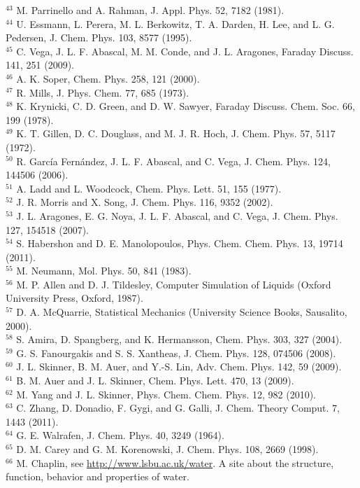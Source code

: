 \documentclass[10pt]{article}
\begin{document}
${ }^{43}$ M. Parrinello and A. Rahman, J. Appl. Phys. 52, 7182 (1981).\\
${ }^{44}$ U. Essmann, L. Perera, M. L. Berkowitz, T. A. Darden, H. Lee, and L. G. Pedersen, J. Chem. Phys. 103, 8577 (1995).\\
${ }^{45}$ C. Vega, J. L. F. Abascal, M. M. Conde, and J. L. Aragones, Faraday Discuss. 141, 251 (2009).\\
${ }^{46}$ A. K. Soper, Chem. Phys. 258, 121 (2000).\\
${ }^{47}$ R. Mills, J. Phys. Chem. 77, 685 (1973).\\
${ }^{48}$ K. Krynicki, C. D. Green, and D. W. Sawyer, Faraday Discuss. Chem. Soc. 66, 199 (1978).\\
${ }^{49}$ K. T. Gillen, D. C. Douglass, and M. J. R. Hoch, J. Chem. Phys. 57, 5117 (1972).\\
${ }^{50}$ R. García Fernández, J. L. F. Abascal, and C. Vega, J. Chem. Phys. 124, 144506 (2006).\\
${ }^{51}$ A. Ladd and L. Woodcock, Chem. Phys. Lett. 51, 155 (1977).\\
${ }^{52}$ J. R. Morris and X. Song, J. Chem. Phys. 116, 9352 (2002).\\
${ }^{53}$ J. L. Aragones, E. G. Noya, J. L. F. Abascal, and C. Vega, J. Chem. Phys. 127, 154518 (2007).\\
${ }^{54}$ S. Habershon and D. E. Manolopoulos, Phys. Chem. Chem. Phys. 13, 19714 (2011).\\
${ }^{55}$ M. Neumann, Mol. Phys. 50, 841 (1983).\\
${ }^{56}$ M. P. Allen and D. J. Tildesley, Computer Simulation of Liquids (Oxford University Press, Oxford, 1987).\\
${ }^{57}$ D. A. McQuarrie, Statistical Mechanics (University Science Books, Sausalito, 2000).\\
${ }^{58}$ S. Amira, D. Spangberg, and K. Hermansson, Chem. Phys. 303, 327 (2004).\\
${ }^{59}$ G. S. Fanourgakis and S. S. Xantheas, J. Chem. Phys. 128, 074506 (2008).\\
${ }^{60}$ J. L. Skinner, B. M. Auer, and Y.-S. Lin, Adv. Chem. Phys. 142, 59 (2009).\\
${ }^{61}$ B. M. Auer and J. L. Skinner, Chem. Phys. Lett. 470, 13 (2009).\\
${ }^{62}$ M. Yang and J. L. Skinner, Phys. Chem. Chem. Phys. 12, 982 (2010).\\
${ }^{63}$ C. Zhang, D. Donadio, F. Gygi, and G. Galli, J. Chem. Theory Comput. 7, 1443 (2011).\\
${ }^{64}$ G. E. Walrafen, J. Chem. Phys. 40, 3249 (1964).\\
${ }^{65}$ D. M. Carey and G. M. Korenowski, J. Chem. Phys. 108, 2669 (1998).\\
${ }^{66}$ M. Chaplin, see \href{http://www.lsbu.ac.uk/water}{http://www.lsbu.ac.uk/water}. A site about the structure, function, behavior and properties of water.
\end{document}
